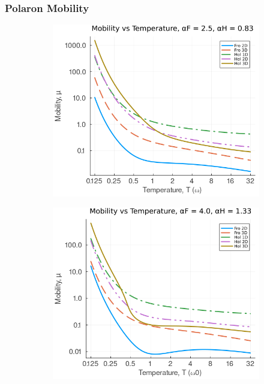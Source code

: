 \subsubsection{Polaron Mobility}

\begin{figure}[!tbp]
  \begin{subfigure}[b]{0.49\textwidth}
    \includegraphics[width=\textwidth]{figures/mobility_temp_25_083.png}
  \end{subfigure}
  \hfill
  \begin{subfigure}[b]{0.49\textwidth}
    \includegraphics[width=\textwidth]{figures/mobility_temp_4_133.png}

\end{subfigure}
\end{figure}

